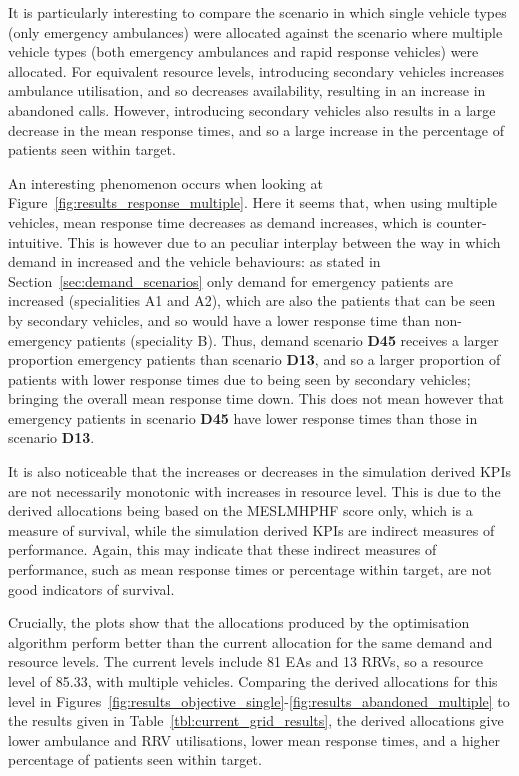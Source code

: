 \documentclass[preprint,12pt]{elsarticle}
\begin{document}
It is particularly interesting to compare the scenario in which single vehicle
types (only emergency ambulances) were allocated against the scenario where
multiple vehicle types (both emergency ambulances and rapid response vehicles)
were allocated. For equivalent resource levels, introducing secondary vehicles
increases ambulance utilisation, and so decreases availability, resulting in
an increase in abandoned calls. However, introducing secondary vehicles also
results in a large decrease in the mean response times, and so a large
increase in the percentage of patients seen within target.

An interesting phenomenon occurs when looking at
Figure~\ref{fig:results_response_multiple}. Here it seems that, when using
multiple vehicles, mean response time decreases as demand increases, which is
counter-intuitive. This is however due to an peculiar interplay between the way
in which demand in increased and the vehicle behaviours: as stated in
Section~\ref{sec:demand_scenarios} only demand for emergency patients are
increased (specialities A1 and A2), which are also the patients that can be seen
by secondary vehicles, and so would have a lower response time than
non-emergency patients (speciality B). Thus, demand scenario \textbf{D45}
receives a larger proportion emergency patients than scenario \textbf{D13}, and
so a larger proportion of patients with lower response times due to being seen
by secondary vehicles; bringing the overall mean response time down. This does
not mean however that emergency patients in scenario \textbf{D45} have lower
response times than those in scenario \textbf{D13}.

It is also noticeable that the increases or decreases in the simulation
derived KPIs are not necessarily monotonic with increases in resource level.
This is due to the derived allocations being based on the MESLMHPHF score
only, which is a measure of survival, while the simulation derived KPIs are
indirect measures of performance. Again, this may indicate that these indirect
measures of performance, such as mean response times or percentage within
target, are not good indicators of survival.

Crucially, the plots show that the allocations produced by the optimisation
algorithm perform better than the current allocation for the same demand and
resource levels. The current levels include 81 EAs and 13 RRVs, so a resource
level of 85.33, with multiple vehicles. Comparing the derived allocations for
this level in
Figures~\ref{fig:results_objective_single}-\ref{fig:results_abandoned_multiple}
to the results given in Table~\ref{tbl:current_grid_results}, the derived
allocations give lower ambulance and RRV utilisations, lower mean response
times, and a higher percentage of patients seen within target.
\end{document}
